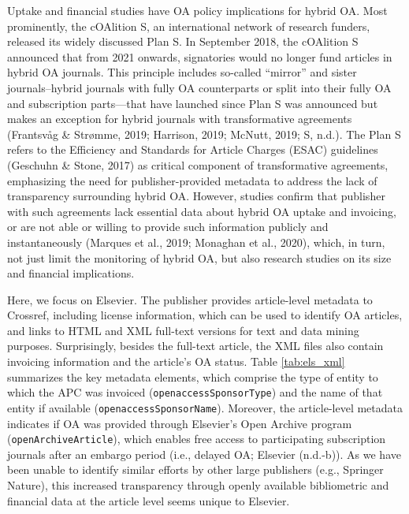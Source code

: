 \documentclass[a4paper,man,floatsintext,longtable,noextraspace,12pt]{apa6}
\begin{document}
Uptake and financial studies have OA policy implications for hybrid OA.
Most prominently, the cOAlition S, an international network of research
funders, released its widely discussed Plan S. In September 2018, the
cOAlition S announced that from 2021 onwards, signatories would no
longer fund articles in hybrid OA journals. This principle includes
so-called ``mirror'' and sister journals--hybrid journals with fully OA
counterparts or split into their fully OA and subscription parts---that
have launched since Plan S was announced but makes an exception for
hybrid journals with transformative agreements (Frantsvåg \& Strømme,
2019; Harrison, 2019; McNutt, 2019; S, n.d.). The Plan S refers to the
Efficiency and Standards for Article Charges (ESAC) guidelines (Geschuhn
\& Stone, 2017) as critical component of transformative agreements,
emphasizing the need for publisher-provided metadata to address the lack
of transparency surrounding hybrid OA. However, studies confirm that
publisher with such agreements lack essential data about hybrid OA
uptake and invoicing, or are not able or willing to provide such
information publicly and instantaneously (Marques et al., 2019; Monaghan
et al., 2020), which, in turn, not just limit the monitoring of hybrid
OA, but also research studies on its size and financial implications.

Here, we focus on Elsevier. The publisher provides article-level
metadata to Crossref, including license information, which can be used
to identify OA articles, and links to HTML and XML full-text versions
for text and data mining purposes. Surprisingly, besides the full-text
article, the XML files also contain invoicing information and the
article's OA status. Table \ref{tab:els_xml} summarizes the key metadata
elements, which comprise the type of entity to which the APC was
invoiced (\texttt{openaccessSponsorType}) and the name of that entity if
available (\texttt{openaccessSponsorName}). Moreover, the article-level
metadata indicates if OA was provided through Elsevier's Open Archive
program (\texttt{openArchiveArticle}), which enables free access to
participating subscription journals after an embargo period (i.e.,
delayed OA; Elsevier (n.d.-b)). As we have been unable to identify
similar efforts by other large publishers (e.g., Springer Nature), this
increased transparency through openly available bibliometric and
financial data at the article level seems unique to Elsevier.
\end{document}
